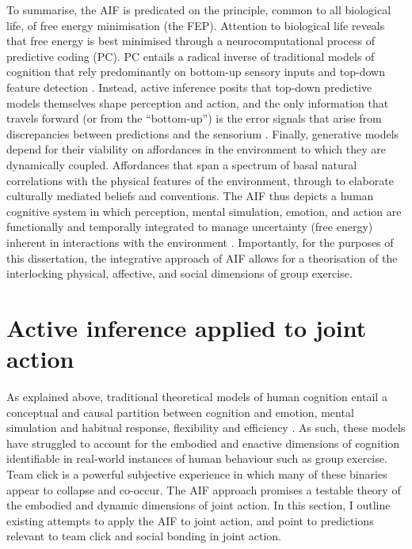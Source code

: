 \begin{CJK}{UTF8}{gbsn}
To summarise, the AIF is predicated on the principle, common to all biological life, of free energy minimisation (the FEP).   Attention to biological life reveals that free energy is best minimised through a neurocomputational process of predictive coding (PC). PC entails a radical inverse of traditional models of cognition that rely predominantly on bottom-up sensory inputs and top-down feature detection \citep[e.g.,][]{Marr1985}. Instead, active inference posits that top-down predictive models themselves shape perception and action, and the only information that travels forward (or from the ``bottom-up'') is the error signals that arise from discrepancies between predictions and the sensorium \citep{Pickering2014}.  Finally, generative models depend for their viability on affordances in the environment to which they are dynamically coupled.  Affordances that span a spectrum of basal natural correlations with the physical features of the environment, through to elaborate culturally mediated beliefs and conventions.  The AIF thus depicts a human cognitive system in which perception, mental simulation, emotion, and action are functionally and temporally integrated to manage uncertainty (free energy) inherent in interactions with the environment \citep{Clark2013}.  Importantly, for the purposes of this dissertation, the integrative approach of AIF allows for a theorisation of the interlocking physical, affective, and social dimensions of group exercise.


\section{Active inference applied to joint action \label{sect:activeInfJA}}
As explained above, traditional theoretical models of human cognition entail a conceptual and causal partition between cognition and emotion, mental simulation and habitual response, flexibility and efficiency \citep{Clark2015}.  As such, these models have struggled to account for the embodied and enactive dimensions of cognition identifiable in real-world instances of human behaviour such as group exercise.  Team click is a powerful subjective experience in which many of these binaries appear to collapse and co-occur.  The AIF approach promises a testable theory of the embodied and dynamic dimensions of joint action.  In this section, I outline existing attempts to apply the AIF to joint action, and point to predictions relevant to team click and social bonding in joint action.


\end{CJK}
